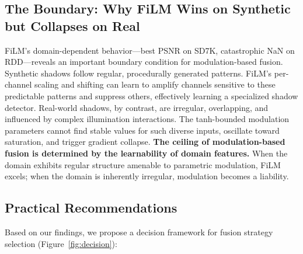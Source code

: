 \documentclass[pdflatex,sn-basic,Numbered]{sn-jnl}
\theoremstyle{thmstyleone}
\theoremstyle{thmstyletwo}
\theoremstyle{thmstylethree}
\begin{document}
\subsection{The Boundary: Why FiLM Wins on Synthetic but Collapses on Real}

FiLM's domain-dependent behavior---best PSNR on SD7K, catastrophic NaN on RDD---reveals an important boundary condition for modulation-based fusion.
Synthetic shadows follow regular, procedurally generated patterns.
FiLM's per-channel scaling and shifting can learn to amplify channels sensitive to these predictable patterns and suppress others, effectively learning a specialized shadow detector.
Real-world shadows, by contrast, are irregular, overlapping, and influenced by complex illumination interactions.
The tanh-bounded modulation parameters cannot find stable values for such diverse inputs, oscillate toward saturation, and trigger gradient collapse.
\textbf{The ceiling of modulation-based fusion is determined by the learnability of domain features.}
When the domain exhibits regular structure amenable to parametric modulation, FiLM excels; when the domain is inherently irregular, modulation becomes a liability.

\subsection{Practical Recommendations}

Based on our findings, we propose a decision framework for fusion strategy selection (Figure~\ref{fig:decision}):
\end{document}
